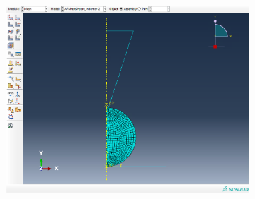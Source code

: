 \begin{figure}[H]
    \hfill
    \begin{subfigure}{0.3\textwidth}
        \centering
        \caption{\label{fig: Capped-Sphere-ABAQUS-setup}}
        \includegraphics[width=1\linewidth]{Figures/Capped-Sphere-ABAQUS-setup.png}
    \end{subfigure}   
    
    \hfill
    

\end{figure}
